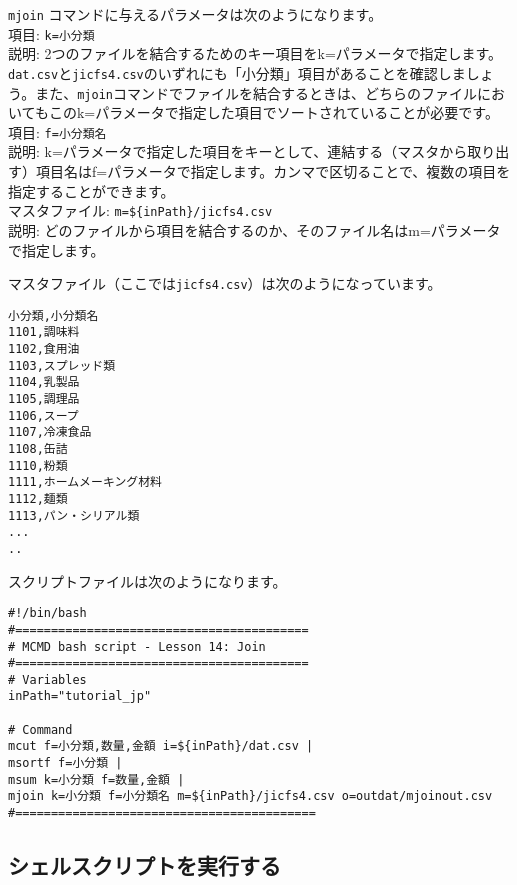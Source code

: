 {\setlength{\parindent}{0cm}

\verb|mjoin| コマンドに与えるパラメータは次のようになります。\\

項目: \verb|k=小分類| \\
説明: 2つのファイルを結合するためのキー項目をk=パラメータで指定します。\verb|dat.csv|と\verb|jicfs4.csv|のいずれにも「小分類」項目があることを確認しましょう。また、\verb|mjoin|コマンドでファイルを結合するときは、どちらのファイルにおいてもこのk=パラメータで指定した項目でソートされていることが必要です。\\

項目: \verb|f=小分類名| \\
説明: k=パラメータで指定した項目をキーとして、連結する（マスタから取り出す）項目名はf=パラメータで指定します。カンマで区切ることで、複数の項目を指定することができます。\\

マスタファイル: \verb|m=${inPath}/jicfs4.csv| \\
説明: どのファイルから項目を結合するのか、そのファイル名はm=パラメータで指定します。

マスタファイル（ここでは\verb|jicfs4.csv|）は次のようになっています。\\

\begin{verbatim}
小分類,小分類名
1101,調味料
1102,食用油
1103,スプレッド類
1104,乳製品
1105,調理品
1106,スープ
1107,冷凍食品
1108,缶詰
1110,粉類
1111,ホームメーキング材料
1112,麺類
1113,パン・シリアル類
...
..
\end{verbatim}
}

スクリプトファイルは次のようになります。\\

\begin{verbatim}
#!/bin/bash
#=========================================
# MCMD bash script - Lesson 14: Join 
#=========================================
# Variables
inPath="tutorial_jp"

# Command 
mcut f=小分類,数量,金額 i=${inPath}/dat.csv | 
msortf f=小分類 |   
msum k=小分類 f=数量,金額 |   
mjoin k=小分類 f=小分類名 m=${inPath}/jicfs4.csv o=outdat/mjoinout.csv
#==========================================
\end{verbatim}

\subsection{シェルスクリプトを実行する}
 
